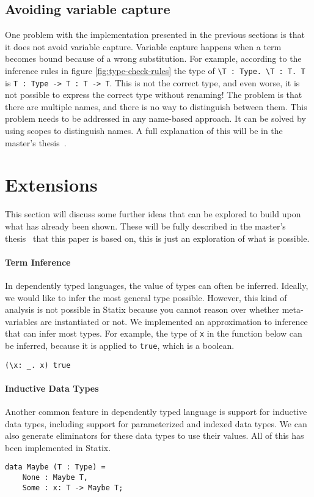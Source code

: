\documentclass[a4paper,UKenglish,cleveref, autoref, thm-restate]{oasics-v2021}
\begin{document}
\subsection{Avoiding variable capture}
One problem with the implementation presented in the previous sections is that it does not avoid variable capture. Variable capture happens when a term becomes bound because of a wrong substitution. For example, according to the inference rules in figure \ref{fig:type-check-rules} the type of \verb|\T : Type. \T : T. T| is \verb|T : Type -> T : T -> T|. This is not the correct type, and even worse, it is not possible to express the correct type without renaming! The problem is that there are multiple names, and there is no way to distinguish between them. This problem needs to be addressed in any name-based approach. It can be solved by using scopes to distinguish names. A full explanation of this will be in the master's thesis~\cite{thesis}. 

\section{Extensions}
\label{sec:extensions}
This section will discuss some further ideas that can be explored to build upon what has already been shown. These will be fully described in the master's thesis~\cite{thesis} that this paper is based on, this is just an exploration of what is possible.

\paragraph*{Term Inference}
In dependently typed languages, the value of types can often be inferred. Ideally, we would like to infer the most general type possible. However, this kind of analysis is not possible in Statix because you cannot reason over whether meta-variables are instantiated or not. We implemented an approximation to inference that can infer most types. For example, the type of \verb|x| in the function below can be inferred, because it is applied to \verb|true|, which is a boolean.
\begin{lstlisting}
(\x: _. x) true
\end{lstlisting}

\paragraph*{Inductive Data Types}
Another common feature in dependently typed language is support for inductive data types, including support for parameterized and indexed data types. We can also generate eliminators for these data types to use their values. All of this has been implemented in Statix. 
\begin{lstlisting}
data Maybe (T : Type) = 
    None : Maybe T,
    Some : x: T -> Maybe T;
\end{lstlisting}
\end{document}
